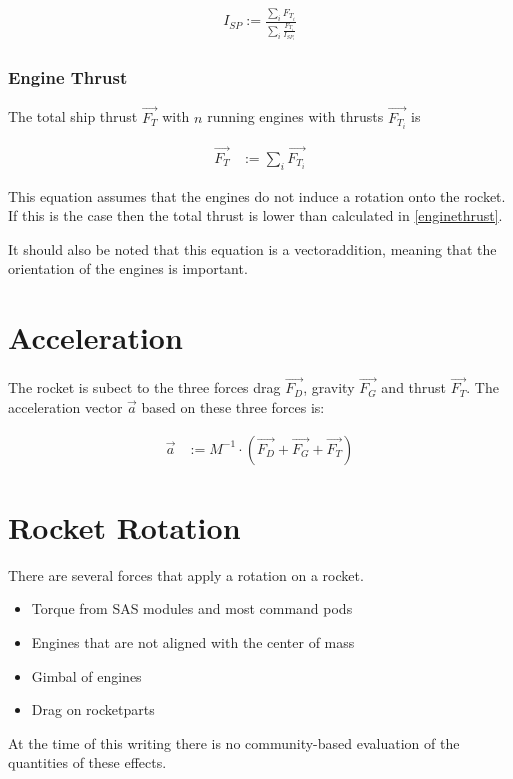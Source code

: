 \documentclass[11pt]{article}
\newcommand{\oa}[1]{\overrightarrow{#1}}
\newcommand{\F}[1]{\oa{F_{#1}}}
\begin{document}
\begin{align}
  I_{SP} := \frac{\sum_i{F_{T_i}}}{\sum_i{\frac{F_{T_i}}{I_{SP_i}}}}
\end{align}

\subsubsection{Engine Thrust}

The total ship thrust $\F{T}$ with $n$ running engines with thrusts
$\F{T_i}$ is

\begin{align}
  \F{T} & := \sum_{i}\F{T_i}\label{enginethrust}
\end{align}

This equation assumes that the engines do not induce a rotation onto
the rocket. If this is the case then the total thrust is lower than
calculated in \eqref{enginethrust}.

It should also be noted that this equation is a vectoraddition,
meaning that the orientation of the engines is important.

\section{Acceleration}

The rocket is subect to the three forces drag $\F{D}$, gravity $\F{G}$
and thrust $\F{T}$.  The acceleration vector $\oa{a}$ based on these
three forces is:

\begin{align}
  \oa{a} &:= M^{-1} \cdot(\F{D} + \F{G} + \F{T})
\end{align}

\section{Rocket Rotation}

There are several forces that apply a rotation on a rocket.

\begin{itemize}
\item Torque from SAS modules and most command pods
\item Engines that are not aligned with the center of mass
\item Gimbal of engines
\item Drag on rocketparts
\end{itemize}

At the time of this writing there is no community-based evaluation of
the quantities of these effects.
\end{document}

